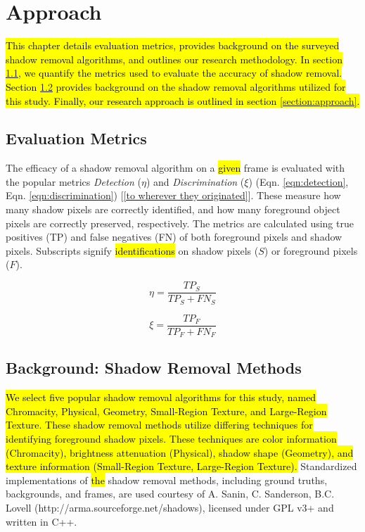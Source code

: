 \clearpage
\chapter{Approach}

\hl{This chapter details evaluation metrics, provides background on the surveyed shadow removal algorithms, and outlines our research methodology. In section \ref{section:eval_metrics}, we quantify the metrics used to evaluate the accuracy of shadow removal. Section \ref{section:removalmethods} provides background on the shadow removal algorithms utilized for this study. Finally, our research approach is outlined in section \ref{section:approach}.}

\section{Evaluation Metrics} \label{section:eval_metrics}

The efficacy of a shadow removal algorithm on a \hl{given} frame is evaluated with the popular metrics \textit{Detection} ($\eta$) and \textit{Discrimination} ($\xi$) (Eqn. \ref{eqn:detection}, Eqn. \ref{eqn:discrimination}) [\ref{to wherever they originated}]. These measure how many shadow pixels are correctly identified, and how many foreground object pixels are correctly preserved, respectively. The metrics are calculated using true positives (TP) and false negatives (FN) of both foreground pixels and shadow pixels. Subscripts signify \hl{identifications} on shadow pixels ($S$) or foreground pixels ($F$).

\begin{equation}
\eta = \dfrac{TP_{S}}{TP_{S} + FN_{S}} \label{eqn:detection}
\end{equation}

\begin{equation}
\xi = \dfrac{TP_{F}}{TP_{F} + FN_{F}} \label{eqn:discrimination}
\end{equation}

\section{Background: Shadow Removal Methods} \label{section:removalmethods}

\hl{We select five popular shadow removal algorithms for this study, named Chromacity, Physical, Geometry, Small-Region Texture, and Large-Region Texture. These shadow removal methods utilize differing techniques for identifying foreground shadow pixels. These techniques are color information (Chromacity), brightness attenuation (Physical), shadow shape (Geometry), and texture information (Small-Region Texture, Large-Region Texture).} Standardized implementations of \hl{the} shadow removal methods, including ground truths, backgrounds, and frames, are used courtesy of A. Sanin, C. Sanderson, B.C. Lovell (http://arma.sourceforge.net/shadows), licensed under GPL v3+ and written in C++.

